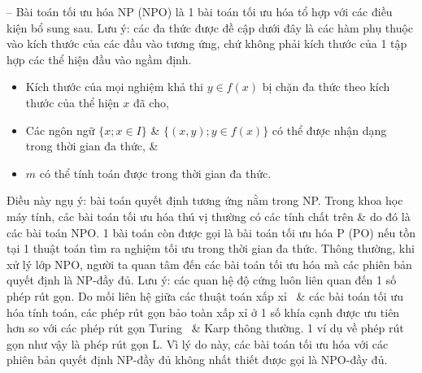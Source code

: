 \documentclass{article}
\begin{document}
-- Bài toán tối ưu hóa NP (NPO) là 1 bài toán tối ưu hóa tổ hợp với các điều kiện bổ sung sau. Lưu ý: các đa thức được đề cập dưới đây là các hàm phụ thuộc vào kích thước của các đầu vào tương ứng, chứ không phải kích thước của 1 tập hợp các thể hiện đầu vào ngầm định.
\begin{itemize}
    \item Kích thước của mọi nghiệm khả thi $y\in f(x)$ bị chặn đa thức theo kích thước của thể hiện $x$ đã cho,
    \item Các ngôn ngữ $\{x;x\in I\}$ \& $\{(x,y);y\in f(x)\}$ có thể được nhận dạng trong thời gian đa thức, \&
    \item $m$ có thể tính toán được trong thời gian đa thức.
\end{itemize}
Điều này ngụ ý: bài toán quyết định tương ứng nằm trong NP. Trong khoa học máy tính, các bài toán tối ưu hóa thú vị thường có các tính chất trên \& do đó là các bài toán NPO. 1 bài toán còn được gọi là bài toán tối ưu hóa P (PO) nếu tồn tại 1 thuật toán tìm ra nghiệm tối ưu trong thời gian đa thức. Thông thường, khi xử lý lớp NPO, người ta quan tâm đến các bài toán tối ưu hóa mà các phiên bản quyết định là NP-đầy đủ. Lưu ý: các quan hệ độ cứng luôn liên quan đến 1 số phép rút gọn. Do mối liên hệ giữa các thuật toán xấp xỉ \ \& các bài toán tối ưu hóa tính toán, các phép rút gọn bảo toàn xấp xỉ ở 1 số khía cạnh được ưu tiên hơn so với các phép rút gọn Turing \ \& Karp thông thường. 1 ví dụ về phép rút gọn như vậy là phép rút gọn L. Vì lý do này, các bài toán tối ưu hóa với các phiên bản quyết định NP-đầy đủ không nhất thiết được gọi là NPO-đầy đủ.
\end{document}
